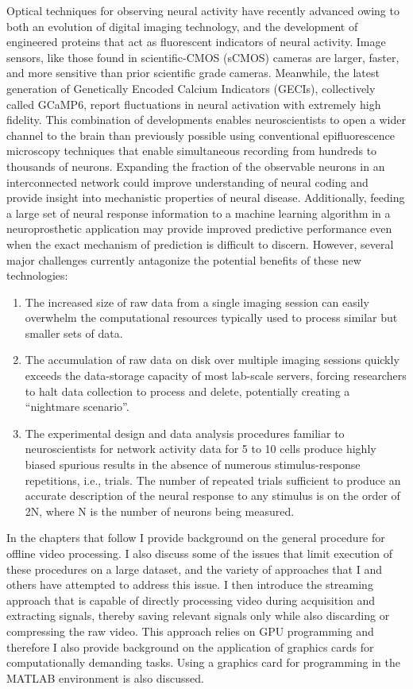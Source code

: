 \documentclass[
  12pt,
]{report}
\providecommand{\tightlist}{%
  \setlength{\itemsep}{0pt}\setlength{\parskip}{0pt}}
\numberwithin{figure}{section}
\numberwithin{table}{section}
\numberwithin{equations}{section}
\begin{document}
Optical techniques for observing neural activity have recently advanced
owing to both an evolution of digital imaging technology, and the
development of engineered proteins that act as fluorescent indicators of
neural activity. Image sensors, like those found in scientific-CMOS
(sCMOS) cameras are larger, faster, and more sensitive than prior
scientific grade cameras. Meanwhile, the latest generation of
Genetically Encoded Calcium Indicators (GECIs), collectively called
GCaMP6, report fluctuations in neural activation with extremely high
fidelity. This combination of developments enables neuroscientists to
open a wider channel to the brain than previously possible using
conventional epifluorescence microscopy techniques that enable
simultaneous recording from hundreds to thousands of neurons. Expanding
the fraction of the observable neurons in an interconnected network
could improve understanding of neural coding and provide insight into
mechanistic properties of neural disease. Additionally, feeding a large
set of neural response information to a machine learning algorithm in a
neuroprosthetic application may provide improved predictive performance
even when the exact mechanism of prediction is difficult to discern.
However, several major challenges currently antagonize the potential
benefits of these new technologies:

\begin{enumerate}
\def\labelenumi{\arabic{enumi}.}
\tightlist
\item
  The increased size of raw data from a single imaging session can
  easily overwhelm the computational resources typically used to process
  similar but smaller sets of data.
\item
  The accumulation of raw data on disk over multiple imaging sessions
  quickly exceeds the data-storage capacity of most lab-scale servers,
  forcing researchers to halt data collection to process and delete,
  potentially creating a ``nightmare scenario''.
\item
  The experimental design and data analysis procedures familiar to
  neuroscientists for network activity data for 5 to 10 cells produce
  highly biased spurious results in the absence of numerous
  stimulus-response repetitions, i.e., trials. The number of repeated
  trials sufficient to produce an accurate description of the neural
  response to any stimulus is on the order of 2N, where N is the number
  of neurons being measured.
\end{enumerate}

In the chapters that follow I provide background on the general
procedure for offline video processing. I also discuss some of the
issues that limit execution of these procedures on a large dataset, and
the variety of approaches that I and others have attempted to address
this issue. I then introduce the streaming approach that is capable of
directly processing video during acquisition and extracting signals,
thereby saving relevant signals only while also discarding or
compressing the raw video. This approach relies on GPU programming and
therefore I also provide background on the application of graphics cards
for computationally demanding tasks. Using a graphics card for
programming in the MATLAB environment is also discussed.
\end{document}
